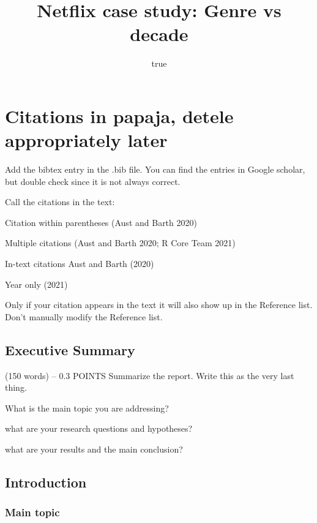 \documentclass[
  man]{apa6}
\title{Netflix case study: Genre vs decade}
\author{true}
\date{}
\begin{document}
\maketitle

{
\setcounter{tocdepth}{3}
\tableofcontents
}
\hypertarget{citations-in-papaja-detele-appropriately-later}{%
\section{Citations in papaja, detele appropriately
later}\label{citations-in-papaja-detele-appropriately-later}}

Add the bibtex entry in the .bib file. You can find the entries in
Google scholar, but double check since it is not always correct.

Call the citations in the text:

Citation within parentheses (Aust and Barth 2020)

Multiple citations (Aust and Barth 2020; R Core Team 2021)

In-text citations Aust and Barth (2020)

Year only (2021)

Only if your citation appears in the text it will also show up in the
Reference list. Don't manually modify the Reference list.

\hypertarget{executive-summary}{%
\subsection{Executive Summary}\label{executive-summary}}

(150 words) -- 0.3 POINTS Summarize the report. Write this as the very
last thing.

What is the main topic you are addressing?

what are your research questions and hypotheses?

what are your results and the main conclusion?

\hypertarget{introduction}{%
\subsection{Introduction}\label{introduction}}

\hypertarget{main-topic}{%
\subsubsection{Main topic}\label{main-topic}}
\end{document}
